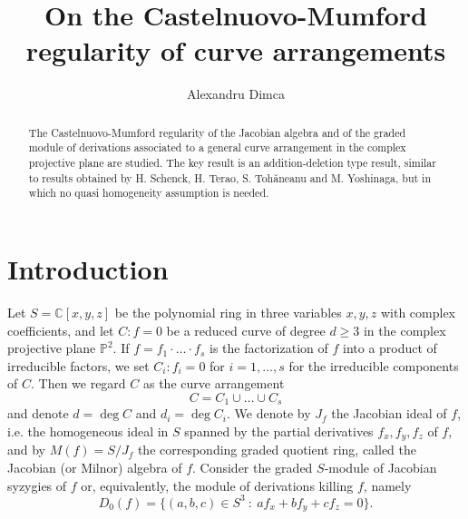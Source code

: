 \documentclass[12pt]{amsart}
\theoremstyle{plain}
\theoremstyle{definition}
\numberwithin{equation}{section}
\newcommand{\C}{\mathbb{C}}
\newcommand{\PP}{\mathbb{P}}
\begin{document}

\title [On the Castelnuovo-Mumford regularity of curve arrangements]
{On the Castelnuovo-Mumford regularity of curve arrangements}

\author[Alexandru Dimca]{Alexandru Dimca}
\address{Universit\'e C\^ ote d'Azur, CNRS, LJAD, France and Simion Stoilow Institute of Mathematics,
P.O. Box 1-764, RO-014700 Bucharest, Romania}










\begin{abstract}  The Castelnuovo-Mumford regularity of the Jacobian algebra and of the graded module of derivations associated to a general curve arrangement in the complex projective plane are studied. The key result is an addition-deletion type result, similar to results obtained by
H. Schenck, H. Terao, S. Toh\u aneanu and  M. Yoshinaga, but in which no quasi homogeneity assumption is needed. 
\end{abstract}
 
\maketitle


\section{Introduction} 

Let $S=\C[x,y,z]$ be the polynomial ring in three variables $x,y,z$ with complex coefficients, and let $C:f=0$ be a reduced curve of degree $d\geq 3$ in the complex projective plane $\PP^2$. If $f=f_1\cdot \ldots \cdot f_s$ is the factorization of $f$ into a product of irreducible factors,
we set $C_i:f_i=0$ for $i=1, \ldots ,s$ for the irreducible components of $C$. Then we regard $C$ as the curve arrangement
$$C=C_1 \cup \ldots \cup C_s$$
and denote $d=\deg C$ and $d_i= \deg C_i$.
We denote by $J_f$ the Jacobian ideal of $f$, i.e. the homogeneous ideal in $S$ spanned by the partial derivatives $f_x,f_y,f_z$ of $f$, and  by $M(f)=S/J_f$ the corresponding graded quotient ring, called the Jacobian (or Milnor) algebra of $f$.
Consider the graded $S$-module of Jacobian syzygies of $f$ or, equivalently, the module of derivations killing $f$, namely
$$D_0(f)=\{(a,b,c) \in S^3 \ : \ af_x+bf_y+cf_z=0\}.$$
\end{document}

